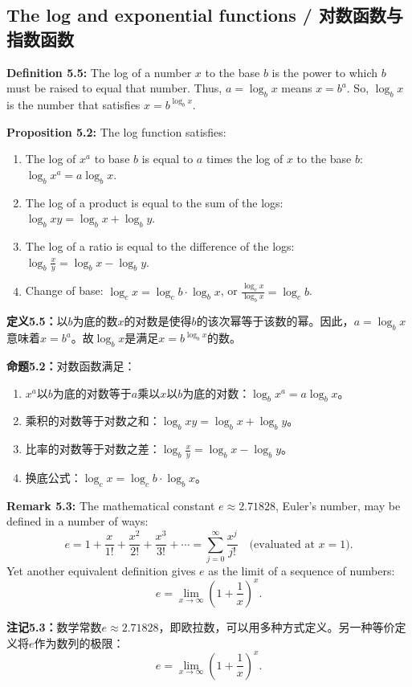 \subsection{The log and exponential functions / 对数函数与指数函数}

\begin{original}
\textbf{Definition 5.5:} The log of a number $x$ to the base $b$ is the power to which $b$ must be raised to equal that number. Thus, $a = \log_b x$ means $x = b^a$. So, $\log_b x$ is the number that satisfies $x = b^{\log_b x}$.

\textbf{Proposition 5.2:} The log function satisfies:
\begin{enumerate}
\item The log of $x^a$ to base $b$ is equal to $a$ times the log of $x$ to the base $b$: $\log_b x^a = a \log_b x$.
\item The log of a product is equal to the sum of the logs: $\log_b xy = \log_b x + \log_b y$.
\item The log of a ratio is equal to the difference of the logs: $\log_b \frac{x}{y} = \log_b x - \log_b y$.
\item Change of base: $\log_c x = \log_c b \cdot \log_b x$, or $\frac{\log_c x}{\log_b x} = \log_c b$.
\end{enumerate}
\end{original}
\begin{translation}
\textbf{定义5.5：}以$b$为底的数$x$的对数是使得$b$的该次幂等于该数的幂。因此，$a = \log_b x$意味着$x = b^a$。故$\log_b x$是满足$x = b^{\log_b x}$的数。

\textbf{命题5.2：}对数函数满足：
\begin{enumerate}
\item $x^a$以$b$为底的对数等于$a$乘以$x$以$b$为底的对数：$\log_b x^a = a \log_b x$。
\item 乘积的对数等于对数之和：$\log_b xy = \log_b x + \log_b y$。
\item 比率的对数等于对数之差：$\log_b \frac{x}{y} = \log_b x - \log_b y$。
\item 换底公式：$\log_c x = \log_c b \cdot \log_b x$。
\end{enumerate}
\end{translation}

\begin{original}
\textbf{Remark 5.3:} The mathematical constant $e \approx 2.71828$, Euler's number, may be defined in a number of ways:
\[
e = 1 + \frac{x}{1!} + \frac{x^2}{2!} + \frac{x^3}{3!} + \cdots = \sum_{j=0}^{\infty} \frac{x^j}{j!} \quad \text{(evaluated at } x = 1\text{)}.
\]
Yet another equivalent definition gives $e$ as the limit of a sequence of numbers:
\[
e = \lim_{x \to \infty} \left(1 + \frac{1}{x}\right)^x.
\]
\end{original}
\begin{translation}
\textbf{注记5.3：}数学常数$e \approx 2.71828$，即欧拉数，可以用多种方式定义。另一种等价定义将$e$作为数列的极限：
\[
e = \lim_{x \to \infty} \left(1 + \frac{1}{x}\right)^x.
\]
\end{translation}

